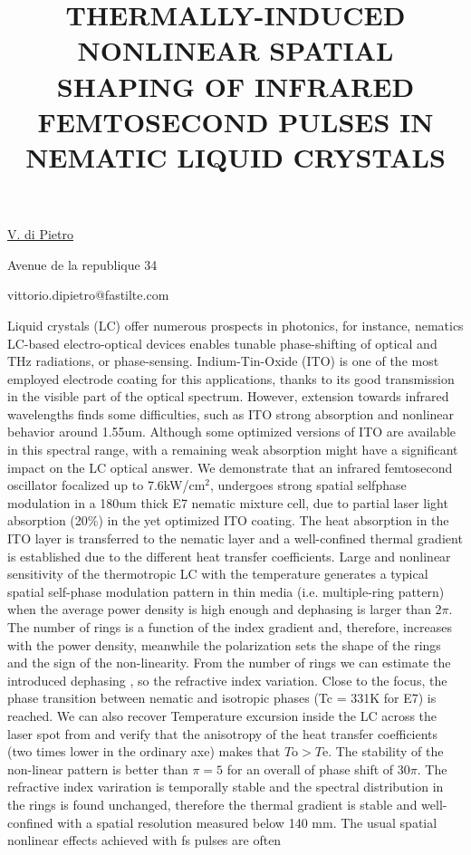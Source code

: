\title{THERMALLY-INDUCED NONLINEAR SPATIAL SHAPING OF INFRARED FEMTOSECOND PULSES IN NEMATIC LIQUID CRYSTALS}

\underline{V. di Pietro}  

{\normalsize{\vspace{-4mm}
Avenue de la republique 34



\email vittorio.dipietro@fastilte.com}}

Liquid crystals (LC) offer numerous prospects in photonics, for instance, nematics LC-based electro-optical devices enables tunable phase-shifting of optical and THz radiations, or phase-sensing. Indium-Tin-Oxide (ITO) is one of the most employed electrode coating for this applications, thanks to its good transmission in the visible
part of the optical spectrum. However, extension towards infrared wavelengths finds some difficulties, such as ITO strong absorption and nonlinear behavior around 1.55um. Although some optimized versions of ITO are available in this spectral range, with a remaining weak absorption might have a significant impact on the LC optical answer. We demonstrate that an infrared femtosecond oscillator focalized up to 7.6kW/cm$^2$, undergoes strong spatial selfphase modulation in a 180um thick E7 nematic mixture cell, due to partial laser light absorption (20\%) in the yet
optimized ITO coating. The heat absorption in the ITO layer is transferred to the nematic layer and a well-confined thermal gradient is established due to the different heat transfer coefficients. Large and nonlinear sensitivity of
the thermotropic LC with the temperature generates a typical spatial self-phase modulation pattern in thin media (i.e. multiple-ring pattern) when the average power density is high enough and dephasing is larger than 2$\pi$. The number of rings  is a function of the index gradient and, therefore, increases with the power density, meanwhile the polarization sets the shape of the rings and the sign of the non-linearity. From the number of rings we can estimate the introduced dephasing , so the refractive index variation. Close to the focus, the phase transition between nematic and isotropic phases (Tc = 331K for E7) is reached. We can also
recover Temperature excursion inside the LC across the laser spot from and verify that the anisotropy of the heat transfer coefficients (two times lower in the ordinary axe) makes that $T\text{o} >T\text{e}$. The stability of the non-linear pattern is better than $\pi =5$ for an overall of phase shift of $30\pi$. The refractive index variration is temporally stable and the spectral distribution in the rings is found unchanged, therefore the thermal gradient is stable and well-confined with a spatial resolution measured below 140 mm. The usual spatial nonlinear effects achieved with fs pulses are often
